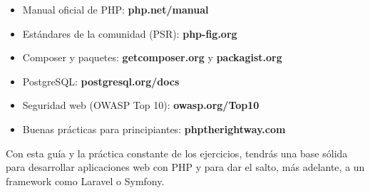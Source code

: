 \documentclass[11pt]{article}
\begin{document}
\begin{itemize}[leftmargin=1.4em,itemsep=2pt,topsep=2pt]
\item Manual oficial de PHP: \textbf{php.net/manual}
\item Estándares de la comunidad (PSR): \textbf{php-fig.org}
\item Composer y paquetes: \textbf{getcomposer.org} y \textbf{packagist.org}
\item PostgreSQL: \textbf{postgresql.org/docs}
\item Seguridad web (OWASP Top 10): \textbf{owasp.org/Top10}
\item Buenas prácticas para principiantes: \textbf{phptherightway.com}
\end{itemize}
Con esta guía y la práctica constante de los ejercicios, tendrás una base sólida para desarrollar aplicaciones web con PHP y para dar el salto, más adelante, a un framework como Laravel o Symfony.
\end{document}
